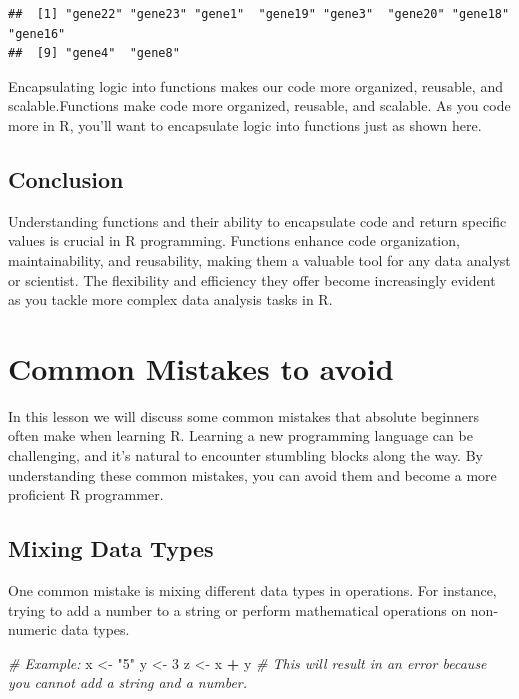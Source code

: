 \documentclass[
]{book}
\newenvironment{Shaded}{\begin{snugshade}}{\end{snugshade}}
\newcommand{\CommentTok}[1]{\textcolor[rgb]{0.56,0.35,0.01}{\textit{#1}}}
\newcommand{\DecValTok}[1]{\textcolor[rgb]{0.00,0.00,0.81}{#1}}
\newcommand{\NormalTok}[1]{#1}
\newcommand{\OtherTok}[1]{\textcolor[rgb]{0.56,0.35,0.01}{#1}}
\newcommand{\SpecialCharTok}[1]{\textcolor[rgb]{0.81,0.36,0.00}{\textbf{#1}}}
\newcommand{\StringTok}[1]{\textcolor[rgb]{0.31,0.60,0.02}{#1}}
\begin{document}
\begin{verbatim}
##  [1] "gene22" "gene23" "gene1"  "gene19" "gene3"  "gene20" "gene18" "gene16"
##  [9] "gene4"  "gene8"
\end{verbatim}

Encapsulating logic into functions makes our code more organized, reusable, and scalable.Functions make code more organized, reusable, and scalable. As you code more in R, you'll want to encapsulate logic into functions just as shown here.

\hypertarget{conclusion-3}{%
\subsection{Conclusion}\label{conclusion-3}}

Understanding functions and their ability to encapsulate code and return specific values is crucial in R programming. Functions enhance code organization, maintainability, and reusability, making them a valuable tool for any data analyst or scientist. The flexibility and efficiency they offer become increasingly evident as you tackle more complex data analysis tasks in R.

\hypertarget{common-mistakes-to-avoid}{%
\section{Common Mistakes to avoid}\label{common-mistakes-to-avoid}}

In this lesson we will discuss some common mistakes that absolute beginners often make when learning R. Learning a new programming language can be challenging, and it's natural to encounter stumbling blocks along the way. By understanding these common mistakes, you can avoid them and become a more proficient R programmer.

\hypertarget{mixing-data-types}{%
\subsection{Mixing Data Types}\label{mixing-data-types}}

One common mistake is mixing different data types in operations. For instance, trying to add a number to a string or perform mathematical operations on non-numeric data types.

\begin{Shaded}
\begin{Highlighting}[]
\CommentTok{\# Example:}
\NormalTok{x }\OtherTok{\textless{}{-}} \StringTok{"5"}
\NormalTok{y }\OtherTok{\textless{}{-}} \DecValTok{3}
\NormalTok{z }\OtherTok{\textless{}{-}}\NormalTok{ x }\SpecialCharTok{+}\NormalTok{ y  }\CommentTok{\# This will result in an error because you cannot add a string and a number.}
\end{Highlighting}
\end{Shaded}
\end{document}
